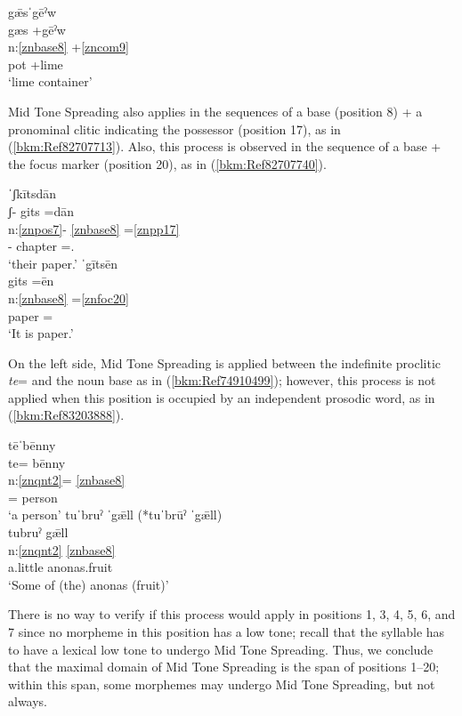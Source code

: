 \documentclass[output=paper]{langscibook}
\begin{document}
\ea\label{ex:key:zap:144}
{gǣsˈgēˀw}\\
\glll gæs +gēˀw\\
n:\ref{znbase8} +\ref{zncom9}  \\
pot +lime\\
\glt {}`lime container'
\z

Mid Tone Spreading also applies in the sequences of a base (position 8) + a pronominal clitic indicating the possessor (position 17), as in (\ref{bkm:Ref82707713}). Also, this process is observed in the sequence of a base + the focus marker (position 20), as in (\ref{bkm:Ref82707740}). 

\ea\label{bkm:Ref82707713}
{ˈʃkītsdān}\\
\glll ʃ{}- gits =dān\\
n:\ref{znpos7}- \ref{znbase8} =\ref{znpp17} \\
\Poss{}- chapter =\Third\Pl.\F{}\\
\glt  `their paper.'
\ex\label{bkm:Ref82707740} 
{ˈgītsēn}\\
\glll gits =ēn\\
n:\ref{znbase8}  =\ref{znfoc20}\\
paper =\Foc{}\\
\glt `It is paper.'
\z

On the left side, Mid Tone Spreading is applied between the indefinite proclitic \textit{te}= and the noun base as in (\ref{bkm:Ref74910499}); however, this process is not applied when this position is occupied by an independent prosodic word, as in (\ref{bkm:Ref83203888}).

\ea\label{bkm:Ref74910499}
{tēˈbēnny}\\
\glll te= bēnny\\
n:\ref{znqnt2}= \ref{znbase8}\\
\Indf{}= person\\
\glt `a person'
\ex\label{bkm:Ref83203888}
{tuˈbruˀ ˈgǣll (*tuˈbrūˀ ˈgǣll)}\\
\glll tubruˀ gǣll\\
n:\ref{znqnt2} \ref{znbase8}\\
a.little anonas.fruit\\
\glt `Some of (the) anonas (fruit)'
\z

There is no way to verify if this process would apply in positions 1, 3, 4, 5, 6, and 7 since no morpheme in this position has a low tone; recall that the syllable has to have a lexical low tone to undergo Mid Tone Spreading. Thus, we conclude that the maximal domain of Mid Tone Spreading is the span of positions 1--20; within this span, some morphemes may undergo Mid Tone Spreading, but not always. 
\end{document}

